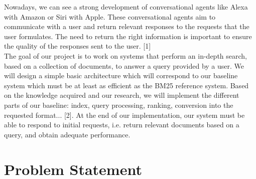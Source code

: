 \documentclass[sigconf]{acmart}
\begin{document}
Nowadays, we can see a strong development of conversational agents like Alexa with Amazon or Siri with Apple. These conversational agents aim to communicate with a user and return relevant responses to the requests that the user formulates. The need to return the right information is important to ensure the quality of the responses sent to the user. [1] \\
The goal of our project is to work on systems that perform an in-depth search, based on a collection of documents, to answer a query provided by a user. We will design a simple basic architecture which will correspond to our baseline system which must be at least as efficient as the BM25 reference system. Based on the knowledge acquired and our research, we will implement the different parts of our baseline: index, query processing, ranking, conversion into the requested format... [2]. At the end of our implementation, our system must be able to respond to initial requests, i.e. return relevant documents based on a query, and obtain adequate performance.
%

\section{Problem Statement}
\end{document}
